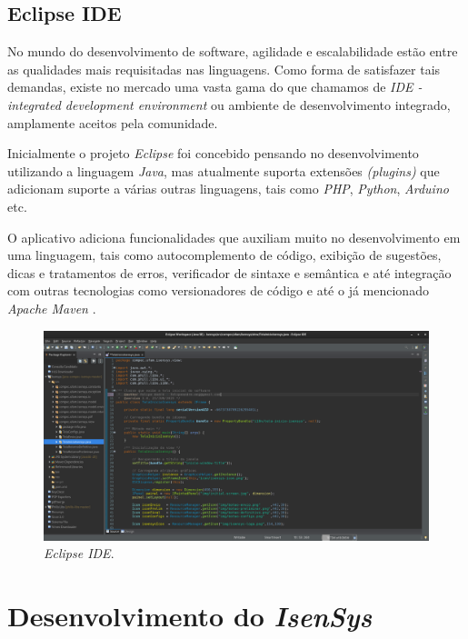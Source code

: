 \documentclass[
	12pt,			%
	openright,		%
	oneside,	
	a4paper,		%
	english,		%
	brazil			%
]{abntex2/abntex2}  %
\begin{document}
		\section{Eclipse IDE}
		
			No mundo do desenvolvimento de software, agilidade e escalabilidade estão entre as qualidades mais requisitadas nas linguagens. Como forma de satisfazer tais demandas, existe no mercado uma vasta gama do que chamamos de \textit{IDE - integrated development environment} ou ambiente de desenvolvimento integrado, amplamente aceitos pela comunidade.
			
			Inicialmente o projeto \textit{Eclipse} \cite{eclipse} foi concebido pensando no desenvolvimento utilizando a linguagem \textit{Java}, mas atualmente suporta extensões \textit{(plugins)} que adicionam suporte a várias outras linguagens, tais como \textit{PHP}, \textit{Python}, \textit{Arduino} etc.
			
			O aplicativo adiciona funcionalidades que auxiliam muito no desenvolvimento em uma linguagem, tais como autocomplemento de código, exibição de sugestões, dicas e tratamentos de erros, verificador de sintaxe e semântica e até integração com outras tecnologias como versionadores de código e até o já mencionado \textit{Apache Maven} \cite{maven}.

			\begin{figure}[H]
				\caption{\label{eclipse-ide}\textit{Eclipse IDE}.}
				\begin{center}
					\includegraphics[scale=0.25]{img/eclipse-ide}
				\end{center}
			\end{figure}

	\chapter{Desenvolvimento do \textit{IsenSys}}
\end{document}
